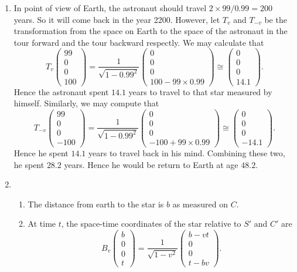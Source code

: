 \begin{enumerate}
\item In point of view of Earth, the astronaut should travel $2\times 99/0.99=200$ years. So it will come back in the year 2200. However, let $T_v$ and $T_{-v}$ be the transformation from the space on Earth to the space of the astronaut in the tour forward and the tour backward respectly. We may calculate that 
\[T_v\begin{pmatrix}99\\0\\0\\100\end{pmatrix}=\frac{1}{\sqrt{1-0.99^2}}\begin{pmatrix}0\\0\\0\\100-99\times 0.99\end{pmatrix}\cong \begin{pmatrix}0\\0\\0\\14.1\end{pmatrix}.\]
Hence the astronaut spent $14.1$ years to travel to that star measured by himself. Similarly, we may compute that 
\[T_{-v}\begin{pmatrix}99\\0\\0\\-100\end{pmatrix}=\frac{1}{\sqrt{1-0.99^2}}\begin{pmatrix}0\\0\\0\\-100+99\times 0.99\end{pmatrix}\cong \begin{pmatrix}0\\0\\0\\-14.1\end{pmatrix}.\]
Hence he spent $14.1$ years to travel back in his mind. Combining these two, he spent $28.2$ years. Hence he would be return to Earth at age $48.2$.
\item \begin{enumerate}
\item The distance from earth to the star is $b$ as measured on $C$.
\item At time $t$, the space-time coordinates of the star relative to $S'$ and $C'$ are 
\[B_v\begin{pmatrix}b\\0\\0\\t\end{pmatrix}=\frac{1}{\sqrt{1-v^2}}\begin{pmatrix}b-vt\\0\\0\\t-bv\end{pmatrix}.\]

\end{enumerate}
\end{enumerate}

